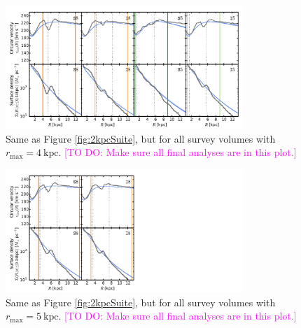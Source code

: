 \documentclass[iop,revtex4,numberedappendix,appendixfloats]{emulateapj}
\newcommand{\Wilma}[1]{\textcolor{Magenta}{#1}}
\begin{document}
\begin{appendix}
\begin{figure}[!htbp]
\centering
\includegraphics[width=0.8\textwidth]{fig/MNdHHdiffSph2_vcirc_surfdens_4kpcSuite.pdf}
\caption{Same as Figure \ref{fig:2kpcSuite}, but for all survey volumes with $r_\text{max}=4~\text{kpc}$. \Wilma{[TO DO: Make sure all final analyses are in this plot.]}}
\label{fig:????}
\end{figure}

\begin{figure}[!htbp]
\centering
\includegraphics[width=0.8\textwidth]{fig/MNdHHdiffSph2_vcirc_surfdens_5kpcSuite.pdf}
\caption{Same as Figure \ref{fig:2kpcSuite}, but for all survey volumes with $r_\text{max}=5~\text{kpc}$. \Wilma{[TO DO: Make sure all final analyses are in this plot.]}}
\label{fig:5kpcSuite}
\end{figure}

\end{appendix}
\end{document}
